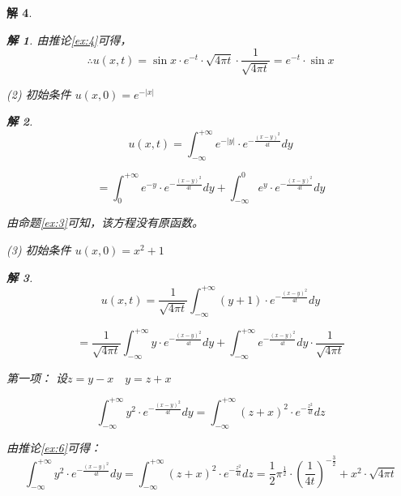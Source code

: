 \documentclass[12pt,a4paper]{article}
\newtheorem*{solution}{解}
\begin{document}
\begin{solution}
\begin{solution}
		由推论\eqref{ex:4}可得，
\begin{equation*}
	\therefore u(x,t) = \sin x \cdot e^{-t} \cdot \sqrt{4\pi t} \cdot \frac{1}{\sqrt{4\pi t}} = e^{-t} \cdot \sin x
\end{equation*}

	\end{solution}


	
(2) 初始条件 \( u(x,0) = e^{-|x|} \)
		\begin{solution}
	
	\begin{equation*}
	u(x,t)=	\int_{-\infty}^{+\infty} e^{-|y|} \cdot e^{-\frac{(x-y)^2}{4t}} dy
	\end{equation*}
	
	\begin{equation*}
		= \int_{0}^{+\infty} e^{-y} \cdot e^{-\frac{(x-y)^2}{4t}} dy + \int_{-\infty}^{0} e^{y} \cdot e^{-\frac{(x-y)^2}{4t}} dy
	\end{equation*}
	
	由命题\eqref{ex:3}可知，该方程没有原函数。
	
		\end{solution}
	
	
(3) 初始条件 \( u(x,0) = x^2 + 1 \)
			\begin{solution}
	
\begin{equation*}
 u(x,t)=\frac{1}{\sqrt{4\pi t}}\int_{-\infty}^{+\infty}(y+1)\cdot e^{-\frac{(x-y)^2}{4t}}dy
\end{equation*}

\begin{equation*}
	=\frac{1}{\sqrt{4\pi t}}\int_{-\infty}^{+\infty} y\cdot e^{-\frac{(x-y)^2}{4t}}dy+\int_{-\infty}^{+\infty} e^{-\frac{(x-y)^2}{4t}}dy\cdot \frac{1}{\sqrt{4\pi t}}
\end{equation*}

第一项：
设$z=y-x\quad y=z+x$



\begin{equation*}
	\int_{-\infty}^{+\infty} y^2 \cdot e^{-\frac{(x-y)^2}{4t}} dy	=\int_{-\infty}^{+\infty}(z+x)^2 \cdot e^{-\frac{z^2}{4t}} dz
\end{equation*}


由推论\eqref{ex:6}可得：
\begin{equation*}
	\int_{-\infty}^{+\infty} y^2 \cdot e^{-\frac{(x-y)^2}{4t}} dy	=\int_{-\infty}^{+\infty}(z+x)^2 \cdot e^{-\frac{z^2}{4t}} dz=\frac{1}{2}\pi^{\frac{1}{2}}\cdot\left(\frac{1}{4t}\right)^{-\frac{3}{2}} +x^2 \cdot \sqrt{4\pi t}
\end{equation*}


\end{solution}
\end{solution}
\end{document}
